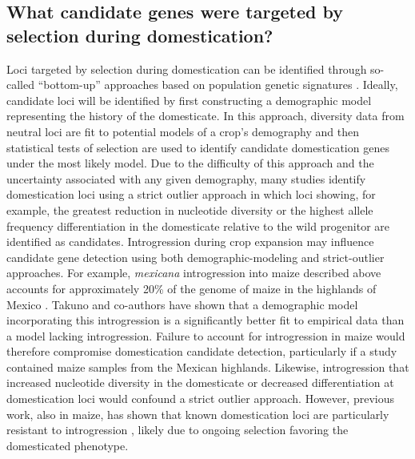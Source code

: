 \documentclass[11pt]{article}
\newcommand{\lwang}[1]{\textcolor{red}{ \emph{\scriptsize  #1}} } %
\begin{document}
\subsection*{What candidate genes were targeted by selection during domestication?}
Loci targeted by selection during domestication can be identified through so-called ``bottom-up'' approaches based on population genetic signatures \cite{Ross-Ibarra2007}.
Ideally, candidate loci will be identified by first constructing a demographic model representing the history of the domesticate.
In this approach, diversity data from neutral loci are fit to potential models of a crop's demography and then statistical tests of selection are used to identify candidate domestication genes under the most likely model.
Due to the difficulty of this approach and the uncertainty associated with any given demography, many studies identify domestication loci using a strict outlier approach in which loci showing, for example, the greatest reduction in nucleotide diversity or the highest allele frequency differentiation in the domesticate relative to the wild progenitor are identified as candidates.
Introgression during crop expansion may influence candidate gene detection using both demographic-modeling and strict-outlier approaches.
For example, \emph{mexicana} introgression into maize described above accounts for approximately 20\% of the genome of maize in the highlands of Mexico \cite{vanHeerwaarden2011}.
Takuno and co-authors \cite{Takuno2015} have shown that a demographic model incorporating this introgression is a significantly better fit to empirical data than a model lacking introgression.
Failure to account for introgression in maize would therefore compromise domestication candidate detection, particularly if a study contained maize samples from the Mexican highlands.
Likewise, introgression that increased nucleotide diversity in the domesticate or decreased differentiation at domestication loci would confound a strict outlier approach.
However, previous work, also in maize, has shown that known domestication loci are particularly resistant to introgression \cite{hufford2013genomic}, likely due to ongoing selection favoring the domesticated phenotype.

\end{document}
